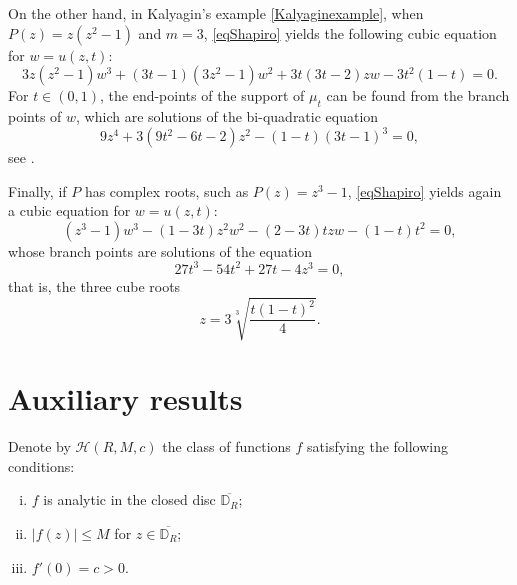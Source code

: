\documentclass[reqno,11pt]{amsart}
\theoremstyle{plain}
\theoremstyle{definition}
\theoremstyle{remark}
\numberwithin{equation}{section}
\numberwithin{equation}{section}
\newcommand{\D}{\mathbb{D}}
\begin{document}
On the other hand, in Kalyagin's example \eqref{Kalyaginexample}, when $P(z)=z(z^2-1)$ and $m=3$, 
\eqref{eqShapiro} yields the following cubic equation for $w=u(z,t)$:
$$
3  z \left(z^2-1\right) w^3+(3 t-1) \left(3 z^2-1\right)w^2+3 t (3 t-2) z w  -3t^2 (1-t) =0.
$$
For $t\in (0,1)$, the end-points of the support of $\mu_t$ can be found from the branch points of $w$, which are solutions of the bi-quadratic equation
$$
9   z^4 + 3 \left(9 t^2-6
   t-2\right) z^2-(1-t) (3 t-1)^3=0,
   $$
see \cite{kaliaguine:1981}.

Finally, if $P$ has complex roots, such as $P(z)=z^3-1$,  \eqref{eqShapiro} yields again a cubic equation for $w=u(z,t)$:
 $$
 (z^3-1) w^3 - (1-3t) z^2 w^2 - (2-3t) t z w -(1-t) t^2=0,
 $$
whose branch points are solutions of the equation
 $$
 27 t^3-54 t^2+27 t-4 z^3=0,
 $$
 that is, the three cube roots
 $$
 z=    3 \sqrt[3]{\frac{t (1-t)^2}{4}}. 
$$ 
  
\appendix

\section{Auxiliary results} \label{appendix}

Denote by $\mathcal H(R, M, c)$ the class of functions $f$ satisfying the following conditions:
\begin{enumerate}[(i)]
    \item $f$ is analytic in the closed disc $\overline{ \D_R}$;
\item $|f(z)| \leq M$ for $  z \in \overline{ \D_R}$;
\item $f'(0) =c > 0$.
\end{enumerate}
\end{document}
